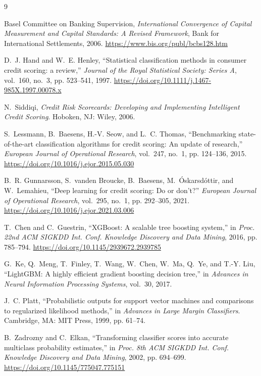 \documentclass[a4paper,twocolumn,10pt]{article}
\begin{document}
\newpage
\begin{thebibliography}{9}

Basel Committee on Banking Supervision, \textit{International Convergence of Capital Measurement and Capital Standards: A Revised Framework}, Bank for International Settlements, 2006. \url{https://www.bis.org/publ/bcbs128.htm}

D.~J. Hand and W.~E. Henley, ``Statistical classification methods in consumer credit scoring: a review,'' \textit{Journal of the Royal Statistical Society: Series A}, vol.~160, no.~3, pp. 523--541, 1997. \url{https://doi.org/10.1111/j.1467-985X.1997.00078.x}

N.~Siddiqi, \textit{Credit Risk Scorecards: Developing and Implementing Intelligent Credit Scoring}. Hoboken, NJ: Wiley, 2006.

S.~Lessmann, B.~Baesens, H.-V. Seow, and L.~C. Thomas, ``Benchmarking state-of-the-art classification algorithms for credit scoring: An update of research,'' \textit{European Journal of Operational Research}, vol.~247, no.~1, pp. 124--136, 2015. \url{https://doi.org/10.1016/j.ejor.2015.05.030}

B.~R. Gunnarsson, S.~vanden Broucke, B.~Baesens, M.~\'Oskarsd\'ottir, and W.~Lemahieu, ``Deep learning for credit scoring: Do or don't?'' \textit{European Journal of Operational Research}, vol.~295, no.~1, pp. 292--305, 2021. \url{https://doi.org/10.1016/j.ejor.2021.03.006}

T.~Chen and C.~Guestrin, ``XGBoost: A scalable tree boosting system,'' in \textit{Proc. 22nd ACM SIGKDD Int. Conf. Knowledge Discovery and Data Mining}, 2016, pp. 785--794. \url{https://doi.org/10.1145/2939672.2939785}

G.~Ke, Q.~Meng, T.~Finley, T.~Wang, W.~Chen, W.~Ma, Q.~Ye, and T.-Y. Liu, ``LightGBM: A highly efficient gradient boosting decision tree,'' in \textit{Advances in Neural Information Processing Systems}, vol.~30, 2017.

J.~C. Platt, ``Probabilistic outputs for support vector machines and comparisons to regularized likelihood methods,'' in \textit{Advances in Large Margin Classifiers}. Cambridge, MA: MIT Press, 1999, pp. 61--74.

B.~Zadrozny and C.~Elkan, ``Transforming classifier scores into accurate multiclass probability estimates,'' in \textit{Proc. 8th ACM SIGKDD Int. Conf. Knowledge Discovery and Data Mining}, 2002, pp. 694--699. \url{https://doi.org/10.1145/775047.775151}


\end{thebibliography}
\end{document}
